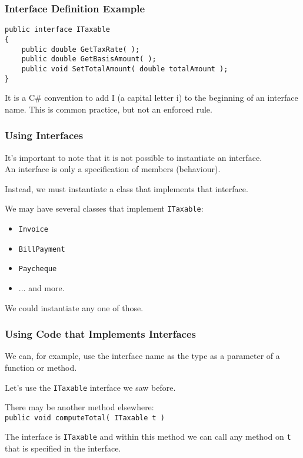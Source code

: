 \begin{frame}[fragile]
\frametitle{Interface Definition Example}

\begin{verbatim}
public interface ITaxable
{
    public double GetTaxRate( );
    public double GetBasisAmount( );
    public void SetTotalAmount( double totalAmount );
}
\end{verbatim}

It is a C\# convention to add I (a capital letter i) to the beginning of an interface name. This is common practice, but not an enforced rule.


\end{frame}

\begin{frame}
\frametitle{Using Interfaces}
It's important to note that it is not possible to instantiate an interface.\\
\quad An interface is only a specification of members (behaviour).

Instead, we must instantiate a class that implements that interface.

We may have several classes that implement \texttt{ITaxable}:
\begin{itemize}
	\item \texttt{Invoice}
	\item \texttt{BillPayment}
	\item \texttt{Paycheque}
	\item ... and more.
\end{itemize}

We could instantiate any one of those.

\end{frame}


\begin{frame}
\frametitle{Using Code that Implements Interfaces}

We can, for example, use the interface name as the type as a parameter of a function or method.

Let's use the \texttt{ITaxable} interface we saw before.

There may be another method elsewhere: \\
\quad \texttt{public void computeTotal( ITaxable t ) }

The interface is \texttt{ITaxable} and within this method we can call any method on \texttt{t} that is specified in the interface.

\end{frame}


